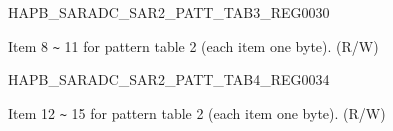 \begin{register}{H}{APB\_SARADC\_SAR2\_PATT\_TAB3\_REG}{\hexprefix{}0030}\label{regdesc:APBSARADCSAR2PATTTAB3REG}
%
\regnewline%
\begin{regdesc}\begin{reglist}
\label{fielddesc:APBSARADCSAR2PATTTAB3}\item [APB\_SARADC\_SAR2\_PATT\_TAB3] Item 8 \verb+~+ 11 for pattern table 2 (each item one byte). (R/W)
\end{reglist}\end{regdesc}
\end{register}


\begin{register}{H}{APB\_SARADC\_SAR2\_PATT\_TAB4\_REG}{\hexprefix{}0034}\label{regdesc:APBSARADCSAR2PATTTAB4REG}
%
\regnewline%
\begin{regdesc}\begin{reglist}
\label{fielddesc:APBSARADCSAR2PATTTAB4}\item [APB\_SARADC\_SAR2\_PATT\_TAB4] Item 12 \verb+~+ 15 for pattern table 2 (each item one byte). (R/W)
\end{reglist}\end{regdesc}
\end{register}


